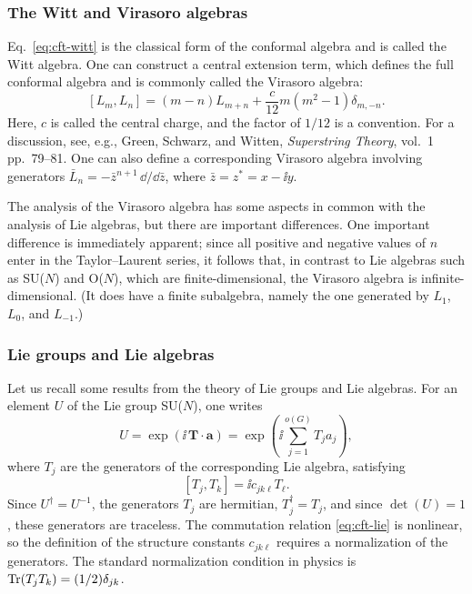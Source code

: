 \subsubsection*{The Witt and Virasoro algebras}

Eq.~\eqref{eq:cft-witt} is the classical form of the conformal algebra and is called the Witt algebra. One can
construct a central extension term, which defines the full conformal algebra and is commonly called the Virasoro
algebra:
\begin{equation}\label{eq:cft-virasoro}
  [L_m,L_n] = (m-n)L_{m+n} + \frac{c}{12}m(m^2-1)\delta_{m,-n} .
\end{equation}
Here, $c$ is called the central charge, and the factor of $1/12$ is a convention. For a discussion, see, e.g., Green,
Schwarz, and Witten, \emph{Superstring Theory}, vol.~1 pp.~79--81. One can also define a corresponding Virasoro algebra
involving generators $\bar L_n = -\bar z^{n+1}\,\dd/\dd\bar z$, where $\bar z = z^* = x-\ii y$.

The analysis of the Virasoro algebra has some aspects in common with the analysis of Lie algebras, but there are
important differences. One important difference is immediately apparent; since all positive and negative values of
$n$ enter in the Taylor--Laurent series, it follows that, in contrast to Lie algebras such as SU($N$) and O($N$), which
are finite-dimensional, the Virasoro algebra is infinite-dimensional. (It does have a finite subalgebra, namely the one
generated by $L_1$, $L_0$, and $L_{-1}$.)

\subsubsection*{Lie groups and Lie algebras}

Let us recall some results from the theory of Lie groups and Lie algebras. For an element $U$ of the Lie group
SU($N$), one writes
\begin{equation}
  U = \exp(\ii\,\mathbf T\cdot\mathbf a) = \exp\left(\ii\sum_{j=1}^{o(G)}T_ja_j\right) ,
\end{equation}
where $T_j$ are the generators of the corresponding Lie algebra, satisfying
\begin{equation}\label{eq:cft-lie}
  [T_j,T_k] = \ii c_{jk\ell}T_\ell .
\end{equation}
Since $U^\dagger = U^{-1}$, the generators $T_j$ are hermitian, $T_j^\dagger = T_j$, and since $\det(U) = 1$, these
generators are traceless. The commutation relation \eqref{eq:cft-lie} is nonlinear, so the definition of the
structure constants $c_{jk\ell}$ requires a normalization of the generators. The standard normalization condition in
physics is $\operatorname{Tr}(T_jT_k) = (1/2)\delta_{jk}$.

